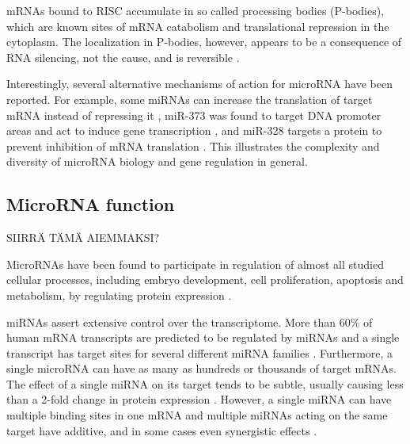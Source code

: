 mRNAs bound to RISC accumulate in so called processing bodies (P-bodies),
which are known sites of mRNA catabolism and translational repression in the
cytoplasm. The localization in P-bodies, however, appears to be a consequence
of RNA silencing, not the cause, and is reversible  \citep{Eulalio2007}.

Interestingly, several alternative mechanisms of action for microRNA have been
reported. For example, some miRNAs can increase the translation of target mRNA instead of
repressing it \citep{Vasudevan2007}, miR-373
was found to target DNA promoter areas and act to induce gene transcription
\citep{Place2008}, and miR-328 targets a protein to prevent inhibition of mRNA
translation \citep{Eiring2010}. This illustrates the complexity and diversity of
microRNA biology and gene regulation in general.






\subsection{MicroRNA function}\label{microrna-function}

SIIRRÄ TÄMÄ AIEMMAKSI?

MicroRNAs have been found to participate in regulation of almost all studied
cellular processes, including embryo development, cell proliferation,
apoptosis and metabolism, by regulating protein expression \cite{}.

miRNAs assert extensive control over the transcriptome. More than 60\% of
human mRNA transcripts are predicted to be regulated by miRNAs and a single
transcript has target sites for several different miRNA families
\citep{Friedman2009}. Furthermore, a single microRNA can have as many as hundreds or
thousands of target mRNAs. The effect of a
single miRNA on its target tends to be subtle, usually causing less than a
2-fold change in protein expression \citep{Baek2008}. However, a single
miRNA can have multiple binding sites in one mRNA and multiple miRNAs
acting on the same target have additive, and in some cases even synergistic
effects \citep{Bartel2009}.



